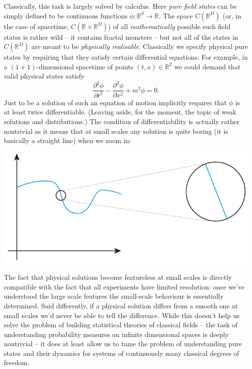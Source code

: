 \documentclass[11pt]{amsart}
\theoremstyle{plain}%
\theoremstyle{definition}
\theoremstyle{remark}
\begin{document}
Classically, this task is largely solved by calculus. Here \emph{pure field states} can be simply defined to be continuous functions $\phi:\mathbb{R}^d\rightarrow \mathbb{R}$. The space $C(\mathbb{R}^D)$ (or, in the case of spacetime, $C(\mathbb{R}\times\mathbb{R}^D)$) of all \emph{mathematically} possible such field states is rather wild -- it contains fractal monsters -- but not all of the states in $C(\mathbb{R}^D)$ are meant to be \emph{physically realisable}. Classically we specify physical pure states by requiring that they satisfy certain differential equations. For example, in a $(1+1)$-dimensional spacetime of points $(t,x)\in \mathbb{R}^2$ we could demand that valid physical states satisfy
\begin{equation}
	\frac{\partial^2\phi}{\partial t^2} - \frac{\partial^2\phi}{\partial x^2} + m^2\phi = 0.
\end{equation}
Just to be a solution of such an equation of motion implicitly requires that $\phi$ is at least twice differentiable. (Leaving aside, for the moment, the topic of weak solutions and distributions.) The condition of differentiability is actually rather nontrivial as it means that at small scales any solution is quite boring (it is basically a straight line) when we zoom in:
\begin{center}
\includegraphics{difffunc.pdf}
\end{center}
The fact that physical solutions become featureless at small scales is directly compatible with the fact that all experiments have limited resolution: once we've understood the large scale features the small-scale behaviour is essentially determined. Said differently, if a physical solution differs from a smooth one at small scales we'd never be able to tell the difference. While this doesn't help us solve the problem of building statistical theories of classical fields -- the task of understanding probability measures on infinite dimensional spaces is deeply nontrivial -- it does at least allow us to tame the problem of understanding pure states and their dynamics for systems of continuously many classical degrees of freedom.
\end{document}
